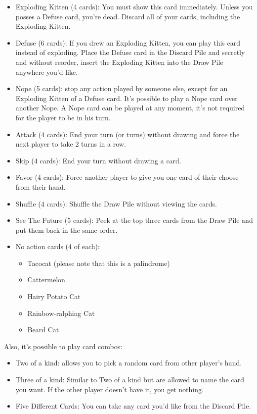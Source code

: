 \documentclass[11pt, fuzz]{article}
\begin{document}
\begin{itemize}
    \item Exploding Kitten (4 cards): You must show this card immediately. Unless you posses a Defuse card, you're dead. Discard all of your cards, including the Exploding Kitten. 
    \item Defuse (6 cards): If you drew an Exploding Kitten, you can play this card instead of exploding. Place the Defuse card in the Discard Pile and secretly and without reorder, insert the Exploding Kitten into the Draw Pile anywhere you'd like. 
    \item Nope (5 cards): stop any action played by someone else, except for an Exploding Kitten of a Defuse card. It's possible to play a Nope card over another Nope. A Nope card can be played at any moment, it's not required for the player to be in his turn. 
    \item Attack (4 cards): End your turn (or turns) without drawing and force the next player to take 2 turns in a row. 
    \item Skip (4 cards): End your turn without drawing a card. 
    \item Favor (4 cards): Force another player to give you one card of their choose from their hand. 
    \item Shuffle (4 cards): Shuffle the Draw Pile without viewing the cards.
    \item See The Future (5 cards): Peek at the top three cards from the Draw Pile and put them back in the same order. 
    \item No action cards (4 of each):
        \begin{itemize}
            \item Tacocat (please note that this is a palindrome)
            \item Cattermelon
            \item Hairy Potato Cat
            \item Rainbow-ralphing Cat
            \item Beard Cat
        \end{itemize}
\end{itemize}

Also, it's possible to play card combos:

\begin{itemize}
    \item Two of a kind: allows you to pick a random card from other player's hand. 
    \item Three of a kind: Similar to Two of a kind but are allowed to name the card you want. If the other player doesn't have it, you get nothing. 
    \item Five Different Cards: You can take any card you'd like from the Discard Pile. 
\end{itemize}
\end{document}
